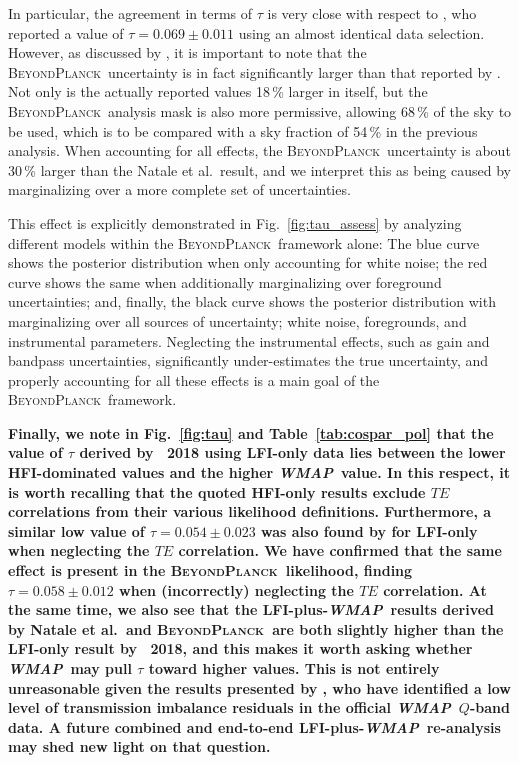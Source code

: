 \documentclass[twocolumn]{aa}
\def\WMAP{\emph{WMAP}}
\newcommand{\BP}{\textsc{BeyondPlanck}}
\begin{document}
In particular, the agreement in terms of $\tau$ is very close with
respect to \citet{natale:2020}, who reported a value of
$\tau=0.069\pm0.011$ using an almost identical data
selection. However, as discussed by \citet{bp12}, it is important to
note that the \BP\ uncertainty is in fact significantly larger than
that reported by \citet{natale:2020}. Not only is the actually
reported values 18\,\% larger in itself, but the \BP\ analysis mask is
also more permissive, allowing 68\,\% of the sky to be used, which is
to be compared with a sky fraction of 54\,\% in the previous
analysis. When accounting for all effects, the \BP\ uncertainty is
about 30\,\% larger than the Natale et al.\ result, and we interpret
this as being caused by marginalizing over a more complete set of
uncertainties.

This effect is explicitly demonstrated in Fig.~\ref{fig:tau_assess} by
analyzing different models within the \BP\ framework alone: The blue
curve shows the posterior distribution when only accounting for white
noise; the red curve shows the same when additionally marginalizing
over foreground uncertainties; and, finally, the black curve shows the
posterior distribution with marginalizing over all sources of
uncertainty; white noise, foregrounds, and instrumental
parameters. Neglecting the instrumental effects, such as gain and
bandpass uncertainties, significantly under-estimates the true
uncertainty, and properly accounting for all these effects is a main
goal of the \BP\ framework.

{\bf Finally, we note in Fig.~\ref{fig:tau} and Table~\ref{tab:cospar_pol} that the value of $\tau$ derived by \Planck\ 2018 using LFI-only data lies between the lower HFI-dominated values and the higher \WMAP\ value. In this respect, it is worth recalling that the quoted HFI-only results exclude $TE$ correlations from their various likelihood definitions. Furthermore, a similar low value of $\tau=0.054\pm0.023$ was also found by \citet{planck2016-l05} for LFI-only when neglecting the $TE$ correlation. We have confirmed that the same effect is present in the \BP\ likelihood, finding $\tau=0.058\pm0.012$ when (incorrectly) neglecting the $TE$ correlation. At the same time, we also see that the LFI-plus-\WMAP\ results derived by Natale et al.\ and \BP\ are both slightly higher than the LFI-only result by \Planck\ 2018, and this makes it worth asking whether \WMAP\ may pull $\tau$ toward higher values. This is not entirely unreasonable given the results presented by \citet{bp17}, who have identified a low level of transmission imbalance residuals in the official \WMAP\ $Q$-band data. A future combined and end-to-end LFI-plus-\WMAP\ re-analysis may shed new light on that question.}
\end{document}
